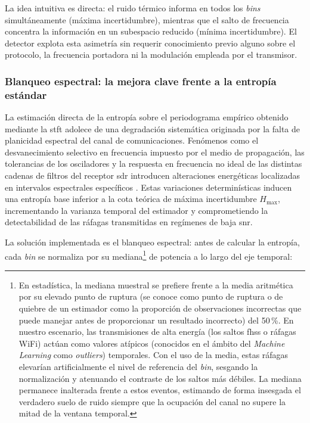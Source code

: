 La idea intuitiva es directa: el ruido térmico informa en todos los \textit{bins} simultáneamente (máxima incertidumbre), mientras que el salto de frecuencia concentra la información en un subespacio reducido (mínima incertidumbre). El detector explota esta asimetría sin requerir conocimiento previo alguno sobre el protocolo, la frecuencia portadora ni la modulación empleada por el transmisor.

\subsubsection{Blanqueo espectral: la mejora clave frente a la entropía estándar}
\label{subsubsec:whitening}

La estimación directa de la entropía sobre el periodograma empírico obtenido mediante la \gls{stft} adolece de una degradación sistemática originada por la falta de planicidad espectral del canal de comunicaciones. Fenómenos como el desvanecimiento selectivo en frecuencia impuesto por el medio de propagación, las tolerancias de los osciladores y la respuesta en frecuencia no ideal de las distintas cadenas de filtros del receptor \gls{sdr} introducen alteraciones energéticas localizadas en intervalos espectrales específicos \cite{tandra_snr_2008}. Estas variaciones determinísticas inducen una entropía base inferior a la cota teórica de máxima incertidumbre $H_{\max}$, incrementando la varianza temporal del estimador y comprometiendo la detectabilidad de las ráfagas transmitidas en regímenes de baja \gls{snr}.

La solución implementada es el blanqueo espectral: antes de calcular la entropía, cada \textit{bin} se normaliza por su mediana\footnote{En estadística, la mediana muestral se prefiere frente a la media aritmética por su elevado punto de ruptura (se conoce como punto de ruptura o de quiebre de un estimador como la proporción de observaciones incorrectas que puede manejar antes de proporcionar un resultado incorrecto) del 50\,\%. En nuestro escenario, las transmisiones de alta energía (los saltos \gls{fhss} o ráfagas WiFi) actúan como valores atípicos (conocidos en el ámbito del \textit{Machine Learning} como \textit{outliers}) temporales. Con el uso de la media, estas ráfagas elevarían artificialmente el nivel de referencia del \textit{bin}, sesgando la normalización y atenuando el contraste de los saltos más débiles. La mediana permanece inalterada frente a estos eventos, estimando de forma insesgada el verdadero suelo de ruido siempre que la ocupación del canal no supere la mitad de la ventana temporal.} de potencia a lo largo del eje temporal:

